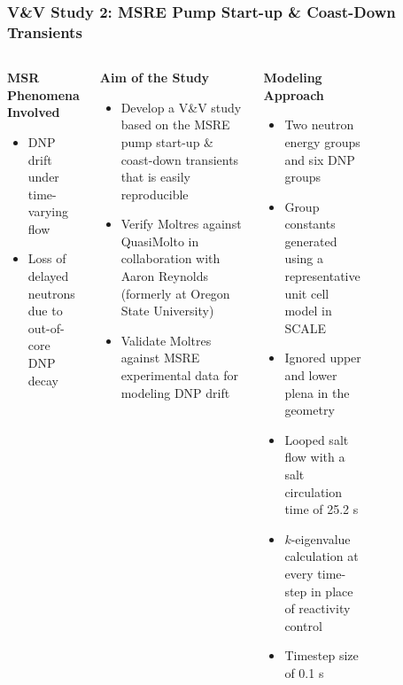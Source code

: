 \begin{frame}
  \frametitle{V\&V Study 2: MSRE Pump Start-up \& Coast-Down Transients}
  \begin{columns}
    \column{6.5cm}
    \begin{block}{\textbf{MSR Phenomena Involved}}
      \begin{itemize}
        \item DNP drift under time-varying flow
        \item Loss of delayed neutrons due to out-of-core DNP decay
      \end{itemize}
    \end{block}
    \begin{block}{\textbf{Aim of the Study}}
      \begin{itemize}
         \item Develop a V\&V study based on the MSRE pump start-up \& coast-down
           transients that is easily reproducible
         \item Verify Moltres against QuasiMolto in collaboration with Aaron Reynolds
           (formerly at Oregon State University)
         \item Validate Moltres against MSRE experimental data for modeling \gls{DNP} drift
       \end{itemize}
    \end{block}
    \begin{block}{\textbf{Modeling Approach}}
      \begin{itemize}
        \item Two neutron energy groups and six DNP groups
        \item Group constants generated using a representative unit cell model in SCALE
        \item Ignored upper and lower plena in the geometry
        \item Looped salt flow with a salt circulation time of 25.2 s
        \item $k$-eigenvalue calculation at every time-step in place of reactivity control
        \item Timestep size of 0.1 s
      \end{itemize}
    \end{block}
    \column{4.5cm}
    \begin{figure}[htb]
      \centering

\end{figure}
\end{columns}
\end{frame}

